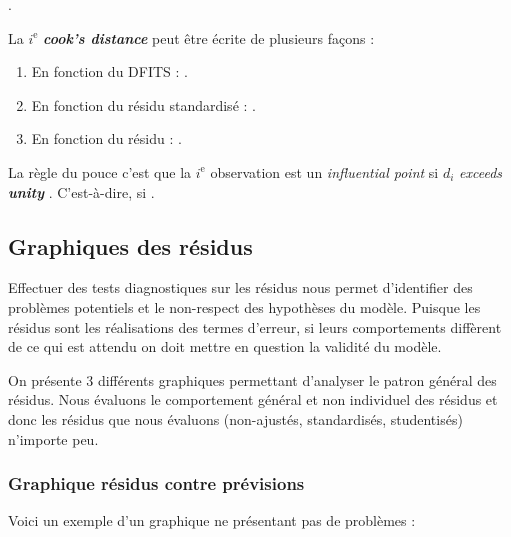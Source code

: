 \documentclass[french]{article}
\begin{document}
\begin{multicols*}{2}
\begin{definitionNOHFILL}[DFITS]
.
\end{definitionNOHFILL}

\begin{definitionNOHFILL}
La $i^{\text{e}}$ \og \textit{\textbf{cook's distance}} \fg{} peut être écrite de plusieurs façons : 
\begin{enumerate}
	\item	En fonction du DFITS : .
	\item	En fonction du résidu standardisé : .
	\item	En fonction du résidu : .
\end{enumerate}
  

\bigskip

La règle du pouce c'est que la $i^{\text{e}}$ observation est un \og \textit{influential point} \fg{} si $d_{i}$ \og \textit{exceeds \textbf{unity}} \fg{}. C'est-à-dire, si .
\end{definitionNOHFILL}
	

\columnbreak
\subsection{Graphiques des résidus}
\begin{rappel_enhanced}[Contexte]
Effectuer des tests diagnostiques sur les résidus nous permet d'identifier des problèmes potentiels et le non-respect des hypothèses du modèle. Puisque les résidus sont les réalisations des termes d'erreur, si leurs comportements diffèrent de ce qui est attendu on doit mettre en question la validité du modèle.

\bigskip

On présente 3 différents graphiques permettant d'analyser le patron général des résidus. Nous évaluons le comportement général et non individuel des résidus et donc les résidus que nous évaluons (non-ajustés, standardisés, studentisés) n'importe peu.
\end{rappel_enhanced}


\subsubsection{Graphique résidus contre prévisions}
Voici un exemple d'un graphique ne présentant pas de problèmes :
\begin{center}
\begin{tikzpicture}[x=0.75pt,y=0.75pt,yscale=-1,xscale=1]


\end{tikzpicture}
\end{center}
\end{multicols*}
\end{document}
